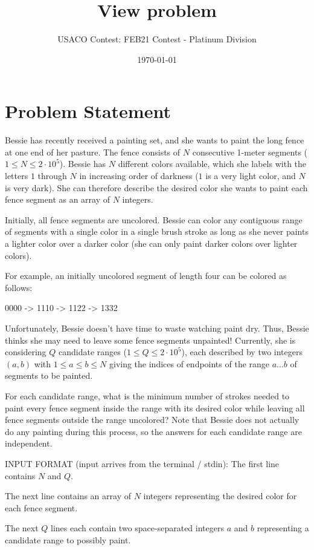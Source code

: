 \documentclass[12pt]{article}
\title{View problem}
\author{USACO Contest: FEB21 Contest - Platinum Division}
\date{\today}
\begin{document}
\maketitle

\section*{Problem Statement}

Bessie has recently received a painting set, and she wants to paint the long
fence at one end of her pasture.  The fence consists of $N$ consecutive 1-meter 
segments ($1\le N\le 2\cdot 10^5$).  Bessie has $N$ different colors available,
which she labels with the letters $1$ through $N$ in increasing order of
darkness ($1$ is a very light color, and $N$ is very dark).  She can therefore
describe the desired color she wants to paint each fence segment as an array of
$N$ integers.

Initially, all fence segments are uncolored.  Bessie can color any  contiguous
range of segments with a single color in a single brush stroke as long as she
never paints a lighter color over a darker color (she can only paint darker
colors over lighter colors).  

For example, an initially uncolored segment of length four can be colored as
follows:


0000 -> 1110 -> 1122 -> 1332

Unfortunately, Bessie doesn't have time to waste watching paint dry. Thus, Bessie thinks she may need to leave some fence segments
unpainted! Currently, she is considering $Q$  candidate ranges
($1\le Q\le 2\cdot 10^5$), each described by two integers $(a,b)$ with
$1 \leq a \leq b \leq N$ giving the indices of  endpoints of the range
$a \ldots b$ of segments to be painted.

For each candidate range, what is the minimum number of strokes needed to paint
every fence segment inside the range with its desired color while  leaving all
fence segments outside the range uncolored?  Note that Bessie does not actually
do any painting during this process, so the answers for each candidate range are
independent. 

INPUT FORMAT (input arrives from the terminal / stdin):
The first line contains $N$ and $Q$.

The next line contains an array of $N$ integers representing the desired color 
for each fence segment.

The next $Q$ lines each contain two space-separated integers $a$ and $b$
representing a candidate range to possibly paint.
\end{document}
